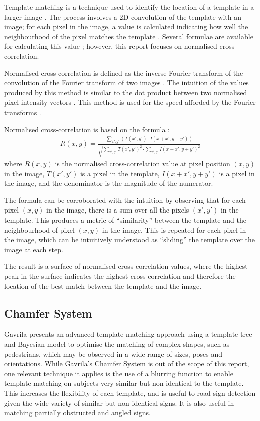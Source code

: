 Template matching is a technique used to identify the location of a template in a larger image \cite{opencv_tm}. The process involves a 2D convolution of the template with an image; for each pixel in the image, a value is calculated indicating how well the neighbourhood of the pixel matches the template \cite{opencv_tm}. Several formulae are available for calculating this value \cite{opencv_tm}; however, this report focuses on normalised cross-correlation.

Normalised cross-correlation is defined as the inverse Fourier transform of the convolution of the Fourier transform of two images \cite{psi_2016}. The intuition of the values produced by this method is similar to the dot product between two normalised pixel intensity vectors \cite{psi_2016}. This method is used for the speed afforded by the Fourier transforms \cite{psi_2016}.

Normalised cross-correlation is based on the formula \cite{opencv_tm}:
\begin{align}
  R(x,y) = \frac{\sum_{x',y'}\left(T(x',y')\cdot I(x+x',y+y')\right)}{\sqrt{\sum_{x',y'} T(x',y')^2 \cdot \sum_{x',y'} I(x+x',y+y')^2}}
\end{align}
where $R(x,y)$ is the normalised cross-correlation value at pixel position $(x,y)$ in the image, $T(x',y')$ is a pixel in the template, $I(x+x', y+y')$ is a pixel in the image, and the denominator is the magnitude of the numerator.

The formula can be corroborated with the intuition by observing that for each pixel $(x,y)$ in the image, there is a sum over all the pixels $(x',y')$ in the template. This produces a metric of ``similarity'' between the template and the neighbourhood of pixel $(x,y)$ in the image. This is repeated for each pixel in the image, which can be intuitively understood as ``sliding'' the template over the image at each step.

The result is a surface of normalised cross-correlation values, where the highest peak in the surface indicates the highest cross-correlation and therefore the location of the best match between the template and the image.

\subsection{Chamfer System}

Gavrila \cite{gavrila_2007} \cite{gavrila_nd} presents an advanced template matching approach using a template tree and Bayesian model to optimise the matching of complex shapes, such as pedestrians, which may be observed in a wide range of sizes, poses and orientations. While Gavrila's Chamfer System \cite{gavrila_nd} is out of the scope of this report, one relevant technique it applies is the use of a blurring function to enable template matching on subjects very similar but non-identical to the template. This increases the flexibility of each template, and is useful to road sign detection given the wide variety of similar but non-identical signs. It is also useful in matching partially obstructed and angled signs.

